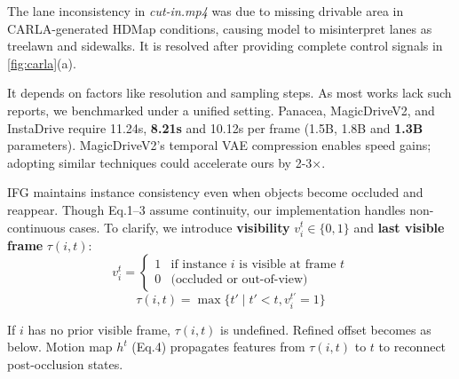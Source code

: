 


The lane inconsistency in \textit{cut-in.mp4} was due to missing drivable area in CARLA-generated HDMap conditions, causing model to misinterpret lanes as treelawn and sidewalks. 
It is resolved after providing complete control signals in \cref{fig:carla}(a).


It depends on factors like resolution and sampling steps. As most works lack such reports, we benchmarked under a unified setting.
Panacea, MagicDriveV2, and InstaDrive require 11.24s, \textbf{8.21s} and 10.12s per frame (1.5B, 1.8B and \textbf{1.3B} parameters). MagicDriveV2’s temporal VAE compression enables speed gains; adopting similar techniques could accelerate ours by 2-3×.





IFG maintains instance consistency even when objects become occluded and reappear. 
Though Eq.1–3 assume continuity, our implementation handles non-continuous cases.
To clarify, we introduce \textbf{visibility} $v_i^t \in \{0,1\}$ and \textbf{last visible frame} $\tau(i,t)$:
\vspace{-2ex}
\begin{equation*}
v_i^t = 
\begin{cases}
    1 & \text{if instance } i \text{ is visible at frame } t \\
    0 & \text{(occluded or out-of-view)} 
\end{cases}
\end{equation*}
\vspace{-3ex}
\begin{equation*}
\tau(i,t) = \max\{t' \mid t' < t, v_i^{t'} = 1\}
\end{equation*}

\vspace{-1.5ex}
\noindent If $i$ has no prior visible frame, $\tau(i,t)$ is undefined. Refined offset becomes as below. Motion map $h^t$ (Eq.4) propagates features from $\tau(i,t)$ to $t$ to reconnect post-occlusion states.

